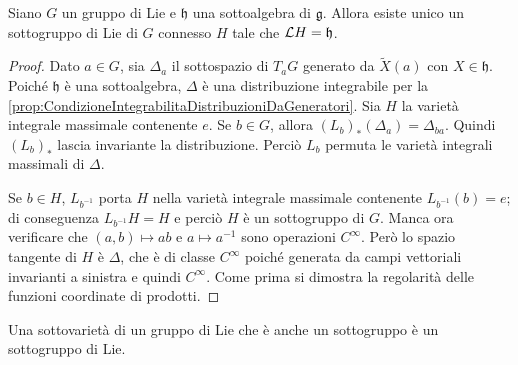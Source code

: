 \begin{theorem}
	Siano $G$ un gruppo di Lie e $\mathfrak h$ una sottoalgebra di $\mathfrak g$. Allora esiste unico un sottogruppo di Lie di $G$ connesso $H$ tale che $\mathcal L H = \mathfrak h$.
\end{theorem}
\begin{proof}
	Dato $a \in G$, sia $\Delta_a$ il sottospazio di $T_aG$ generato da $\tilde X(a)$ con $X\in \mathfrak h$.
	Poiché $\mathfrak h$ è una sottoalgebra, $\Delta$ è una distribuzione integrabile per la \cref{prop:CondizioneIntegrabilitaDistribuzioniDaGeneratori}.
	Sia $H$ la varietà integrale massimale contenente $e$. Se $b \in G$, allora $(L_b)_* (\Delta_a) = \Delta_{ba}$. Quindi $(L_b)_*$ lascia invariante la distribuzione. Perciò $L_b$ permuta le varietà integrali massimali di $\Delta$.
	
	Se $b\in H$, $L_{b^{-1}}$ porta $H$ nella varietà integrale massimale contenente $L_{b^{-1}} (b) =e$; di conseguenza $L_{b^{-1}} H = H$ e perciò $H$ è un sottogruppo di $G$.
	Manca ora verificare che $(a,b) \mapsto ab$ e $a\mapsto a^{-1}$ sono operazioni $C^\infty$.
	Però lo spazio tangente di $H$ è $\Delta$, che è di classe $C^\infty$ poiché generata da campi vettoriali invarianti a sinistra e quindi $C^\infty$.
	Come prima si dimostra la regolarità delle funzioni coordinate di prodotti.
\end{proof}

\begin{remark}
	Una sottovarietà di un gruppo di Lie che è anche un sottogruppo è un sottogruppo di Lie.
\end{remark}










































